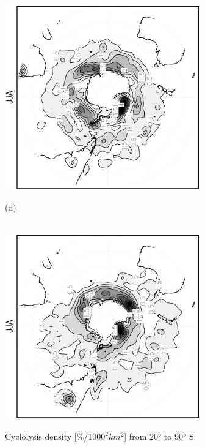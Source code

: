 \documentclass[12pt,a4paper,twoside,openright,headinclude,liststotoc,bibtotoc]{scrreprt}
\begin{document}
\begin{appendix}
\begin{figure}[c]
{\includegraphics[height=8.0cm,angle=-90]
{eps/cycllys_PLASIM_T21_45JJA_SH.eps}
}
\parbox{8.5cm}{\hspace{0.95cm}\begin{scriptsize}(d)\end{scriptsize} \vspace{-0.5cm} \\
\includegraphics[height=8.0cm,angle=-90]
{eps/cycllys_ERA40_T21_45JJA_SH.eps}
}
\caption[Cyclolysis density Southern Hemisphere]{Cyclolysis density [$\%/1000^2 km^2$] from 20° to 90° S}
\label{img:SHcycllys}
\end{figure}

\end{appendix}
\end{document}
